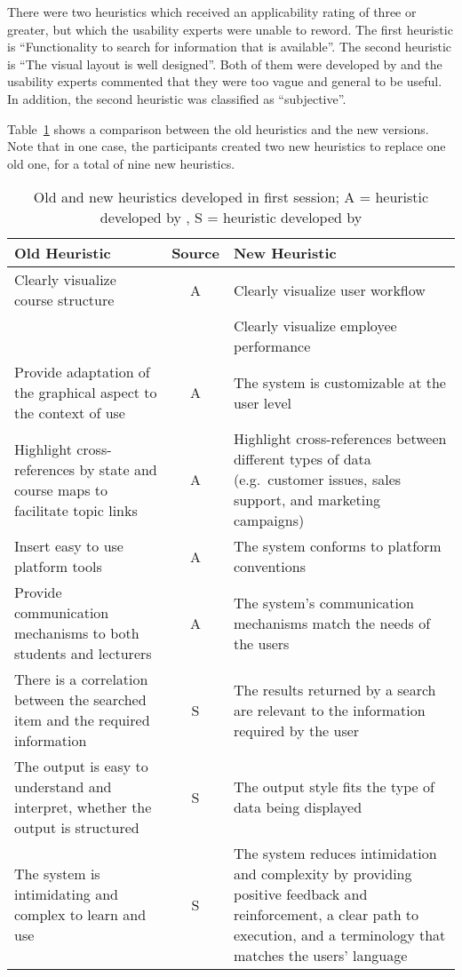 There were two heuristics which received an applicability rating of three or greater, but which the usability experts were unable to reword. The first heuristic is ``Functionality to search for information that is available''. The second heuristic is ``The visual layout is well designed''. Both of them were developed by \citet{Singh2009} and the usability experts commented that they were too vague and general to be useful. In addition, the second heuristic was classified as ``subjective''.

Table~\ref{tab:first_reworded} shows a comparison between the old heuristics and the new versions. Note that in one case, the participants created two new heuristics to replace one old one, for a total of nine new heuristics.

\begin{table}[htbp]
	\centering
	\vspace{0.5cm}
	\caption[Old and new heuristics developed in first session]{Old and new heuristics developed in first session; A = heuristic developed by \citet{Ardito2006}, S = heuristic developed by \citet{Singh2009}}
	\label{tab:first_reworded}
	\begin{tabularx}{\textwidth}{XcX}	\toprule
		\textbf{Old Heuristic} & \textbf{Source} & \textbf{New Heuristic} \\ \midrule
		Clearly visualize course structure & A & Clearly visualize user workflow \\
		& & Clearly visualize employee performance \\
		Provide adaptation of the graphical aspect to the context of use & A & The system is customizable at the user level \\
		Highlight cross-references by state and course maps to facilitate topic links & A & Highlight cross-references between different types of data (e.g.\ customer issues, sales support, and marketing campaigns) \\
		Insert easy to use platform tools & A & The system conforms to platform conventions \\
		Provide communication mech\-an\-is\-ms to both students and lecturers & A & The system's communication me\-ch\-an\-isms match the needs of the users \\
		There is a correlation between the searched item and the required information & S & The results returned by a search a\-r\-e relevant to the information required by the user \\
		The output is easy to understand and interpret, whether the output is structured & S & The output style fits the type of data being displayed \\
		The system is intimidating and co\-mplex to learn and use & S & The system reduces intimidation and complexity by providing positive feedback and reinforcement, a clear path to execution, and a terminology that matches the users' language \\
		\bottomrule
	\end{tabularx}
\end{table}

